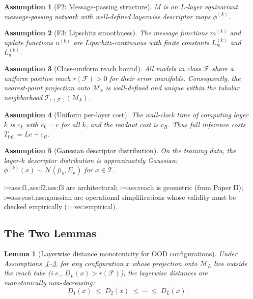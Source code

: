 \documentclass[11pt,a4paper]{article}
\makeatletter
\newcommand{\cref}[1]{\begingroup\def\crefsep{}\@for\crefitem:=#1\do{\crefsep\ref{\crefitem}\def\crefsep{, }}\endgroup}
\newcommand{\Cref}[1]{\cref{#1}}
\newtheorem{lemma}[theorem]{Lemma}
\newtheorem{assumption}{Assumption}[section]
\makeatother
\begin{document}
\begin{assumption}[F2: Message-passing structure]\label{ass:f2}
    $M$ is an $L$-layer equivariant message-passing network with well-defined layerwise descriptor maps $\phi^{(k)}$.
\end{assumption}

\begin{assumption}[F3: Lipschitz smoothness]\label{ass:f3}
    The message functions $m^{(k)}$ and update functions $u^{(k)}$ are Lipschitz-continuous with finite constants $L_m^{(k)}$ and $L_u^{(k)}$.
\end{assumption}

\begin{assumption}[Class-uniform reach bound]\label{ass:reach}
    All models in class $\mathcal{F}$ share a uniform positive reach $r(\mathcal{F})>0$ for their error manifolds. Consequently, the nearest-point projection onto $\mathcal{M}_k$ is well-defined and unique within the tubular neighborhood $\mathcal{T}_{r(\mathcal{F})}(\mathcal{M}_k)$.
\end{assumption}

\begin{assumption}[Uniform per-layer cost]\label{ass:cost}
    The wall-clock time of computing layer $k$ is $c_k$ with $c_k=c$ for all $k$, and the readout cost is $c_R$. Thus full inference costs $T_{\text{full}}=Lc+c_R$.
\end{assumption}

\begin{assumption}[Gaussian descriptor distribution]\label{ass:gaussian}
    On the training data, the layer-$k$ descriptor distribution is approximately Gaussian: $\phi^{(k)}(x)\sim\mathcal{N}(\bar\mu_k,\Sigma_k)$ for $x\in\mathcal{T}$.
\end{assumption}

\Cref{ass:f1,ass:f2,ass:f3} are architectural; \cref{ass:reach} is geometric (from Paper II); \cref{ass:cost,ass:gaussian} are operational simplifications whose validity must be checked empirically (\cref{sec:empirical}).

\subsection{The Two Lemmas}\label{sec:lemmas}

\begin{lemma}[Layerwise distance monotonicity for OOD configurations]\label{lem:monotonicity}
    Under Assumptions~\ref{ass:f2}--\ref{ass:reach}, for any configuration $x$ whose projection onto $\mathcal{M}_L$ lies outside the reach tube (i.e., $D_L(x)>r(\mathcal{F})$), the layerwise distances are monotonically non-decreasing:
    \begin{equation}\label{eq:monotonicity}
        D_1(x) \;\le\; D_2(x) \;\le\; \cdots \;\le\; D_L(x).
    \end{equation}
\end{lemma}
\end{document}
